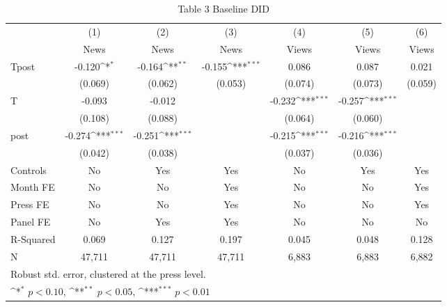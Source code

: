 \documentclass{article}
\begin{document}
\begin{table}[htbp]\centering
\def\sym#1{\ifmmode^{#1}\else\(^{#1}\)\fi}
\caption{Table 3 Baseline DID\label{baseline}}
\begin{tabular*}{\hsize}{@{\hskip\tabcolsep\extracolsep\fill}l*{6}{c}}
\toprule
                &\multicolumn{1}{c}{(1)}&\multicolumn{1}{c}{(2)}&\multicolumn{1}{c}{(3)}&\multicolumn{1}{c}{(4)}&\multicolumn{1}{c}{(5)}&\multicolumn{1}{c}{(6)}\\
                &\multicolumn{1}{c}{News}&\multicolumn{1}{c}{News}&\multicolumn{1}{c}{News}&\multicolumn{1}{c}{Views}&\multicolumn{1}{c}{Views}&\multicolumn{1}{c}{Views}\\
\midrule
Tpost           &   -0.120\sym{*}  &   -0.164\sym{**} &   -0.155\sym{***}&    0.086         &    0.087         &    0.021         \\
                &  (0.069)         &  (0.062)         &  (0.053)         &  (0.074)         &  (0.073)         &  (0.059)         \\
T               &   -0.093         &   -0.012         &                  &   -0.232\sym{***}&   -0.257\sym{***}&                  \\
                &  (0.108)         &  (0.088)         &                  &  (0.064)         &  (0.060)         &                  \\
post            &   -0.274\sym{***}&   -0.251\sym{***}&                  &   -0.215\sym{***}&   -0.216\sym{***}&                  \\
                &  (0.042)         &  (0.038)         &                  &  (0.037)         &  (0.036)         &                  \\
\midrule
Controls        &       No         &      Yes         &      Yes         &       No         &      Yes         &      Yes         \\
Month FE        &       No         &       No         &      Yes         &       No         &       No         &      Yes         \\
Press FE        &       No         &       No         &      Yes         &       No         &       No         &      Yes         \\
Panel FE        &       No         &      Yes         &      Yes         &       No         &       No         &       No         \\
R-Squared       &    0.069         &    0.127         &    0.197         &    0.045         &    0.048         &    0.128         \\
N               &   47,711         &   47,711         &   47,711         &    6,883         &    6,883         &    6,882         \\
\bottomrule
\multicolumn{7}{l}{\footnotesize Robust std. error, clustered at the press level.}\\
\multicolumn{7}{l}{\footnotesize \sym{*} \(p<0.10\), \sym{**} \(p<0.05\), \sym{***} \(p<0.01\)}\\
\end{tabular*}
\end{table}
\end{document}
